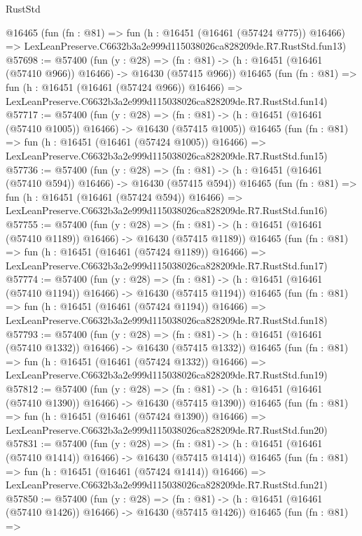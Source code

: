 \begin{lexlean}{RustStd}
\begin{coremodule}
    @16465
    (fun (fn : @81) =>
    fun (h : @16451 (@16461 (@57424 @775)) @16466) =>
    LexLeanPreserve.C6632b3a2e999d115038026ca828209de.R7.RustStd.fun13)
@57698 := @57400
    (fun (y : @28) =>
    (fn : @81) -> (h : @16451 (@16461 (@57410 @966)) @16466) -> @16430 (@57415 @966))
    @16465
    (fun (fn : @81) =>
    fun (h : @16451 (@16461 (@57424 @966)) @16466) =>
    LexLeanPreserve.C6632b3a2e999d115038026ca828209de.R7.RustStd.fun14)
@57717 := @57400
    (fun (y : @28) =>
    (fn : @81) -> (h : @16451 (@16461 (@57410 @1005)) @16466) -> @16430 (@57415 @1005))
    @16465
    (fun (fn : @81) =>
    fun (h : @16451 (@16461 (@57424 @1005)) @16466) =>
    LexLeanPreserve.C6632b3a2e999d115038026ca828209de.R7.RustStd.fun15)
@57736 := @57400
    (fun (y : @28) =>
    (fn : @81) -> (h : @16451 (@16461 (@57410 @594)) @16466) -> @16430 (@57415 @594))
    @16465
    (fun (fn : @81) =>
    fun (h : @16451 (@16461 (@57424 @594)) @16466) =>
    LexLeanPreserve.C6632b3a2e999d115038026ca828209de.R7.RustStd.fun16)
@57755 := @57400
    (fun (y : @28) =>
    (fn : @81) -> (h : @16451 (@16461 (@57410 @1189)) @16466) -> @16430 (@57415 @1189))
    @16465
    (fun (fn : @81) =>
    fun (h : @16451 (@16461 (@57424 @1189)) @16466) =>
    LexLeanPreserve.C6632b3a2e999d115038026ca828209de.R7.RustStd.fun17)
@57774 := @57400
    (fun (y : @28) =>
    (fn : @81) -> (h : @16451 (@16461 (@57410 @1194)) @16466) -> @16430 (@57415 @1194))
    @16465
    (fun (fn : @81) =>
    fun (h : @16451 (@16461 (@57424 @1194)) @16466) =>
    LexLeanPreserve.C6632b3a2e999d115038026ca828209de.R7.RustStd.fun18)
@57793 := @57400
    (fun (y : @28) =>
    (fn : @81) -> (h : @16451 (@16461 (@57410 @1332)) @16466) -> @16430 (@57415 @1332))
    @16465
    (fun (fn : @81) =>
    fun (h : @16451 (@16461 (@57424 @1332)) @16466) =>
    LexLeanPreserve.C6632b3a2e999d115038026ca828209de.R7.RustStd.fun19)
@57812 := @57400
    (fun (y : @28) =>
    (fn : @81) -> (h : @16451 (@16461 (@57410 @1390)) @16466) -> @16430 (@57415 @1390))
    @16465
    (fun (fn : @81) =>
    fun (h : @16451 (@16461 (@57424 @1390)) @16466) =>
    LexLeanPreserve.C6632b3a2e999d115038026ca828209de.R7.RustStd.fun20)
@57831 := @57400
    (fun (y : @28) =>
    (fn : @81) -> (h : @16451 (@16461 (@57410 @1414)) @16466) -> @16430 (@57415 @1414))
    @16465
    (fun (fn : @81) =>
    fun (h : @16451 (@16461 (@57424 @1414)) @16466) =>
    LexLeanPreserve.C6632b3a2e999d115038026ca828209de.R7.RustStd.fun21)
@57850 := @57400
    (fun (y : @28) =>
    (fn : @81) -> (h : @16451 (@16461 (@57410 @1426)) @16466) -> @16430 (@57415 @1426))
    @16465
    (fun (fn : @81) =>

\end{coremodule}
\end{lexlean}
